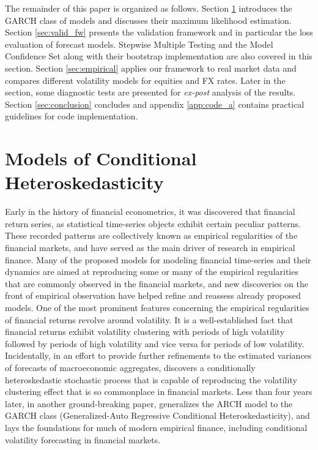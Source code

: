 \documentclass{article} %
\begin{document}
	 The remainder of this paper is organized as follows. Section \ref{sec:models_CH} introduces the GARCH class of models and discusses their maximum likelihood estimation. Section \ref{sec:valid_fw} presents the validation framework and in particular the loss evaluation of forecast models. Stepwise Multiple Testing and the Model Confidence Set along with their bootstrap implementation are also covered in this section. Section \ref{sec:empirical} applies our framework to real market data and compares different volatility models for equities and FX rates. Later in the section, some diagnostic tests are presented for \textit{ex-post} analysis of the results. Section \ref{sec:conclusion} concludes and appendix \ref{app:code_a} contains practical guidelines for code implementation.
	 
	 
	\section{Models of Conditional Heteroskedasticity}\label{sec:models_CH}
	Early in the history of financial econometrics, it was discovered that financial return series, as statistical time-series objects exhibit certain peculiar patterns. These recorded patterns are collectively known as empirical regularities of the financial markets, and have served as the main driver of research in empirical finance. Many of the proposed models for modeling financial time-series and their dynamics are aimed at reproducing some or many of the empirical regularities that are commonly observed in the financial markets, and new discoveries on the front of empirical observation have helped refine and reassess already proposed models. One of the most prominent features concerning the empirical regularities of financial returns revolve around volatility. It is a well-established fact that financial returns exhibit volatility clustering with periods of high volatility followed by periods of high volatility and vice versa for periods of low volatility. Incidentally, in an effort to provide further refinements to the estimated variances of forecasts of macroeconomic aggregates, \textcite{ENGLE1982} discovers a conditionally heteroskedastic stochastic process that is capable of reproducing the volatility clustering effect that is so commonplace in financial markets. Less than four years later, in another ground-breaking paper, \textcite{BOLLERSLEV1986307} generalizes the ARCH model to the GARCH class (Generalized-Auto Regressive Conditional Heteroskedasticity), and lays the foundations for much of modern empirical finance, including conditional volatility forecasting in financial markets. 
	
\end{document}
